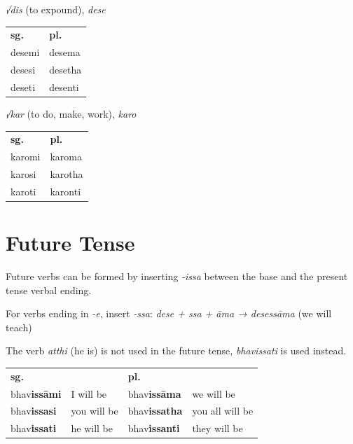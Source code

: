 \documentclass[11pt,oneside]{memoir}
\begin{document}
{\begin{multicols}{3}
\columnbreak

\emph{√dis} (to expound), \emph{dese}

\begin{center}
\begin{tabular}{ll}
\textbf{sg.} & \textbf{pl.}\\[0pt]
desemi & desema\\[0pt]
desesi & desetha\\[0pt]
deseti & desenti\\[0pt]
\end{tabular}
\end{center}

\columnbreak

\emph{√kar} (to do, make, work), \emph{karo}

\begin{center}
\begin{tabular}{ll}
\textbf{sg.} & \textbf{pl.}\\[0pt]
karomi & karoma\\[0pt]
karosi & karotha\\[0pt]
karoti & karonti\\[0pt]
\end{tabular}
\end{center}

\end{multicols}
\par}

\section{Future Tense}
\label{sec:org477f60b}

Future verbs can be formed by inserting \emph{-issa} between the base and the
present tense verbal ending.

For verbs ending in \emph{-e}, insert \emph{-ssa}: \emph{dese + ssa + āma → desessāma} (we will teach)

The verb \emph{atthi} (he is) is not used in the future tense, \emph{bhavissati} is used instead.

\begin{center}
\begin{tabular}{llll}
\textbf{sg.} &  & \textbf{pl.} & \\[0pt]
bhav\textbf{issāmi} & I will be & bhav\textbf{issāma} & we will be\\[0pt]
bhav\textbf{issasi} & you will be & bhav\textbf{issatha} & you all will be\\[0pt]
bhav\textbf{issati} & he will be & bhav\textbf{issanti} & they will be\\[0pt]
\end{tabular}
\end{center}
\end{document}

